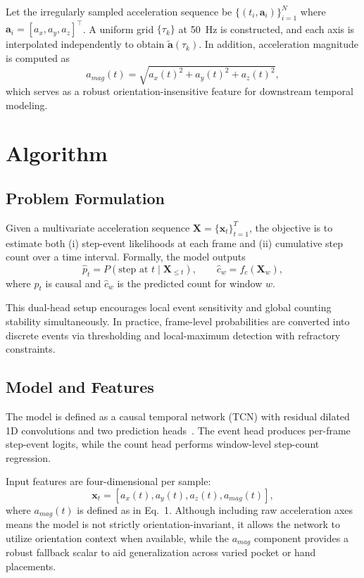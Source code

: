 Let the irregularly sampled acceleration sequence be $\{(t_i, \mathbf{a}_i)\}_{i=1}^{N}$ where $\mathbf{a}_i=[a_x,a_y,a_z]^\top$. A uniform grid $\{\tau_k\}$ at 50~Hz is constructed, and each axis is interpolated independently to obtain $\tilde{\mathbf{a}}(\tau_k)$. In addition, acceleration magnitude is computed as
\begin{equation}
a_{mag}(t)=\sqrt{a_x(t)^2+a_y(t)^2+a_z(t)^2},
\end{equation}
which serves as a robust orientation-insensitive feature for downstream temporal modeling.

\section{Algorithm}
\subsection{Problem Formulation}
Given a multivariate acceleration sequence $\mathbf{X}=\{\mathbf{x}_t\}_{t=1}^{T}$, the objective is to estimate both (i) step-event likelihoods at each frame and (ii) cumulative step count over a time interval. Formally, the model outputs
\begin{equation}
\hat{p}_t = P(\text{step at } t\mid \mathbf{X}_{\le t}), \qquad
\hat{c}_{w}=f_c(\mathbf{X}_{w}),
\end{equation}
where $\hat{p}_t$ is causal and $\hat{c}_{w}$ is the predicted count for window $w$.

This dual-head setup encourages local event sensitivity and global counting stability simultaneously. In practice, frame-level probabilities are converted into discrete events via thresholding and local-maximum detection with refractory constraints.

\subsection{Model and Features}
The model is defined as a causal temporal network (TCN) with residual dilated 1D convolutions and two prediction heads~\cite{bai2018tcn}. The event head produces per-frame step-event logits, while the count head performs window-level step-count regression.

Input features are four-dimensional per sample:
\begin{equation}
\mathbf{x}_t = [a_x(t), a_y(t), a_z(t), a_{mag}(t)],
\end{equation}
where $a_{mag}(t)$ is defined as in Eq.~1. Although including raw acceleration axes means the model is not strictly orientation-invariant, it allows the network to utilize orientation context when available, while the $a_{mag}$ component provides a robust fallback scalar to aid generalization across varied pocket or hand placements.

